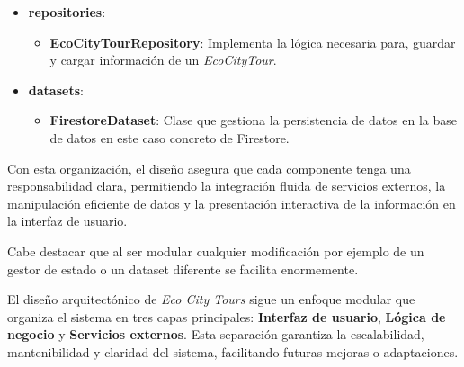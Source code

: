 \begin{itemize}
	\item \textbf{repositories}:
	\begin{itemize}
		\item \textbf{EcoCityTourRepository}: Implementa la lógica necesaria para, guardar y cargar información de un \textit{EcoCityTour}.
	\end{itemize}
	
	\item \textbf{datasets}:
	\begin{itemize}
		\item \textbf{FirestoreDataset}: Clase que gestiona la persistencia de datos en la base de datos en este caso concreto de Firestore.
	\end{itemize}
\end{itemize}

Con esta organización, el diseño asegura que cada componente tenga una responsabilidad clara, permitiendo la integración fluida de servicios externos, la manipulación eficiente de datos y la presentación interactiva de la información en la interfaz de usuario. 

Cabe destacar que al ser modular cualquier modificación por ejemplo de un gestor de estado o un dataset diferente se facilita enormemente.


El diseño arquitectónico de \textit{Eco City Tours} sigue un enfoque modular que organiza el sistema en tres capas principales: \textbf{Interfaz de usuario}, \textbf{Lógica de negocio} y \textbf{Servicios externos}. Esta separación garantiza la escalabilidad, mantenibilidad y claridad del sistema, facilitando futuras mejoras o adaptaciones.

